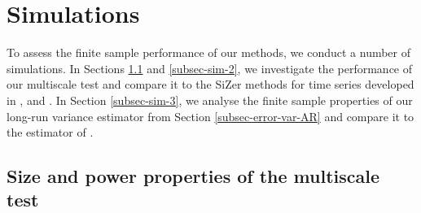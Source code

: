 
\section{Simulations}\label{sec-sim}


To assess the finite sample performance of our methods, we conduct a number of simulations. In Sections \ref{subsec-sim-1} and \ref{subsec-sim-2}, we investigate the performance of our multiscale test and compare it to the SiZer methods for time series developed in \cite{Rondonotti2004}, \cite{Rondonotti2007} and \cite{ParkHannigKang2009}. In Section \ref{subsec-sim-3}, we analyse the finite sample properties of our long-run variance estimator from Section \ref{subsec-error-var-AR} and compare it to the estimator of \cite{Hall2003}. 


\subsection{Size and power properties of the multiscale test}\label{subsec-sim-1} 


